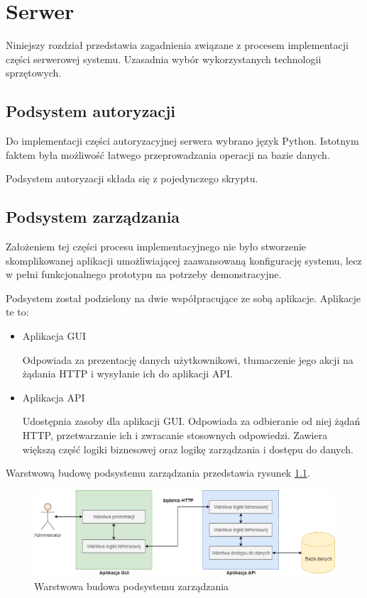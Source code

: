\chapter{Serwer}
\label{chap:server}

    Niniejszy rozdział przedstawia zagadnienia związane z procesem implementacji części serwerowej systemu. Uzasadnia wybór wykorzystanych technologii sprzętowych.

    \section{Podsystem autoryzacji}

    	Do implementacji części autoryzacyjnej serwera wybrano język Python. Istotnym faktem była możliwość łatwego przeprowadzania operacji na bazie danych.

    	Podsystem autoryzacji składa się z pojedynczego skryptu.


    \section{Podsystem zarządzania}

    	Założeniem tej części procesu implementacyjnego nie było stworzenie skomplikowanej aplikacji umożliwiającej zaawansowaną konfigurację systemu, lecz w pełni funkcjonalnego prototypu na potrzeby demonstracyjne.

    	Podsystem został podzielony na dwie współpracujące ze sobą aplikacje. Aplikacje te to:

    	\begin{itemize}
    		\item Aplikacja GUI

    			Odpowiada za prezentację danych użytkownikowi, tłumaczenie jego akcji na żądania HTTP i wysyłanie ich do aplikacji API.

    		\item Aplikacja API

    			Udostępnia zasoby dla aplikacji GUI. Odpowiada za odbieranie od niej żądań HTTP, przetwarzanie ich i zwracanie stosownych odpowiedzi. Zawiera większą część logiki biznesowej oraz logikę zarządzania i dostępu do danych.
    	\end{itemize}

    	Warstwową budowę podsystemu zarządzania przedstawia rysunek \ref{fig:mngmt_subs_layers}.

        \begin{figure}[]
            \centering
            \includegraphics[width=\textwidth]{chapters/images/mngmt_subsystem_layers.png}
            \caption{Warstwowa budowa podsystemu zarządzania}
            \label{fig:mngmt_subs_layers}
        \end{figure}

